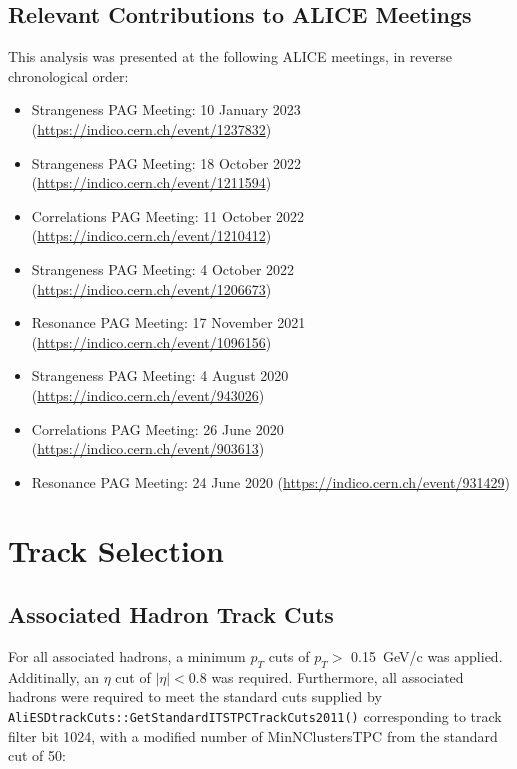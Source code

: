 \documentclass[ALICE,manyauthors]{ALICE_analysis_notes}
\begin{document}
\subsection{Relevant Contributions to ALICE Meetings}
This analysis was presented at the following ALICE meetings, in reverse chronological order:

\begin{itemize}
\item Strangeness PAG Meeting: 10 January 2023 (\url{https://indico.cern.ch/event/1237832})
\item Strangeness PAG Meeting: 18 October 2022 (\url{https://indico.cern.ch/event/1211594})
\item Correlations PAG Meeting: 11 October 2022 (\url{https://indico.cern.ch/event/1210412})
\item Strangeness PAG Meeting: 4 October 2022 (\url{https://indico.cern.ch/event/1206673})
\item Resonance PAG Meeting: 17 November 2021 (\url{https://indico.cern.ch/event/1096156})
\item Strangeness PAG Meeting: 4 August 2020 (\url{https://indico.cern.ch/event/943026})
\item Correlations PAG Meeting: 26 June 2020 (\url{https://indico.cern.ch/event/903613})
\item Resonance PAG Meeting: 24 June 2020 (\url{https://indico.cern.ch/event/931429})
\end{itemize}

\section{Track Selection}

\subsection{Associated Hadron Track Cuts}
\label{assoccuts}
For all associated hadrons, a minimum $p_{T}$ cuts of $p_{T} >$ \SI{0.15}{GeV/c} was applied.  Additinally, an $\eta$ cut of $|{\eta}| < 0.8$ was required. Furthermore, all associated hadrons were required to meet the standard cuts supplied by \texttt{AliESDtrackCuts::GetStandardITSTPCTrackCuts2011()} corresponding to track filter bit 1024, with a modified number of MinNClustersTPC from the standard cut of 50:
\end{document}
